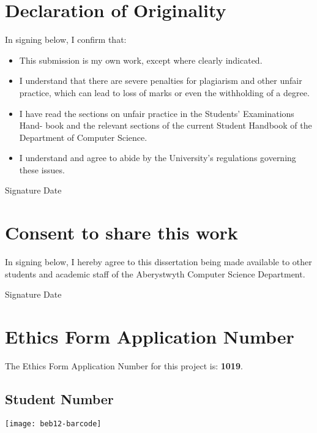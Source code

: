 \section*{Declaration of Originality}

In signing below, I confirm that:

\begin{itemize}
	\item This submission is my own work, except where clearly indicated.
	\item I understand that there are severe penalties for plagiarism and other unfair practice, which can lead to loss of marks or even the withholding of a degree.
	\item I have read the sections on unfair practice in the Students' Examinations Hand- book and the relevant sections of the current Student Handbook of the Department of Computer Science.
	\item I understand and agree to abide by the University's regulations governing these issues.
\end{itemize}

\vspace{1cm}

{ \Large
Signature \hrulefill
\hspace{1cm}
Date \hrulefill
}

\section*{Consent to share this work}

In signing below, I hereby agree to this dissertation being made available to other students and academic staff of the Aberystwyth Computer Science Department.

\vspace{1cm}

{ \Large
Signature \hrulefill
\hspace{1cm}
Date \hrulefill
}

\section*{Ethics Form Application Number}

The Ethics Form Application Number for this project is: \textbf{1019}.

\vfill

\begin{center}
	\section*{\center Student Number}
	\texttt{[image: beb12-barcode]}
\end{center}

\vspace{-3cm}

\ifpaper
	\newpage
	~
\fi